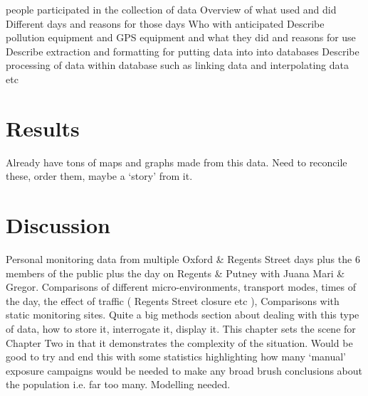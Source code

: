 people participated in the collection of data
Overview of what used and did
Different days and reasons for those days
Who with anticipated 
Describe pollution equipment and GPS equipment and what they did and reasons for use
Describe extraction and formatting for putting data into into databases
Describe processing of data within database such as linking data and interpolating data etc

\section{Results}
\label{sec:c01results}

Already have tons of maps and graphs made from this data. Need to reconcile these, order them, maybe a ‘story’ from it.

\section{Discussion}
\label{c01discussion}

Personal monitoring data from multiple Oxford \& Regents Street days plus the 6 members of the public plus the day on Regents \& Putney with Juana Mari \& Gregor. Comparisons of different micro-environments, transport modes, times of the day, the effect of traffic ( Regents Street closure etc ), Comparisons with static monitoring sites. Quite a big methods section about dealing with this type of data, how to store it, interrogate it, display it. This chapter sets the scene for Chapter Two in that it demonstrates the complexity of the situation. Would be good to try and end this with some statistics highlighting how many ‘manual’ exposure campaigns would be needed to make any broad brush conclusions about the population i.e. far too many. Modelling needed.